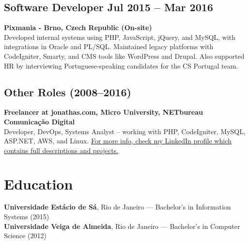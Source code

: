 \documentclass[11pt,a4paper]{article}
\begin{document}
\subsection*{Software Developer \hfill Jul 2015 -- Mar 2016}
\textbf{Pixmania - Brno, Czech Republic (On-site)} \\
Developed internal systems using PHP, JavaScript, jQuery, and MySQL, with integrations in Oracle and PL/SQL. Maintained legacy platforms with CodeIgniter, Smarty, and CMS tools like WordPress and Drupal. Also supported HR by interviewing Portuguese-speaking candidates for the CS Portugal team.

\subsection*{Other Roles (2008–2016)}
\textbf{Freelancer at jonathas.com, Micro University, NETbureau Comunicação Digital} \\
Developer, DevOps, Systems Analyst – working with PHP, CodeIgniter, MySQL, ASP.NET, AWS, and Linux. \href{https://www.linkedin.com/in/jonathasribeiro/}{For more info, check my LinkedIn profile which contains full descriptions and projects.} \\

\section*{\faGraduationCap\hspace{0.5em}Education}
\textbf{Universidade Estácio de Sá}, Rio de Janeiro — Bachelor's in Information Systems (2015) \\
\textbf{Universidade Veiga de Almeida}, Rio de Janeiro — Bachelor's in Computer Science (2012)
\end{document}
